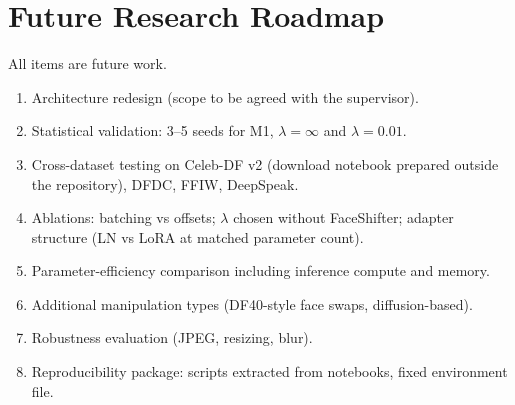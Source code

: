 \documentclass[10pt,a4paper]{article}
\begin{document}
\section{Future Research Roadmap}\label{sec:roadmap}
All items are future work.
\begin{enumerate}
\item Architecture redesign (scope to be agreed with the supervisor).
\item Statistical validation: 3--5 seeds for M1, \(\lambda=\infty\) and \(\lambda=0.01\).
\item Cross-dataset testing on Celeb-DF v2 (download notebook prepared outside the repository), DFDC,
FFIW, DeepSpeak.
\item Ablations: batching vs offsets; \(\lambda\) chosen without FaceShifter; adapter structure (LN vs
LoRA at matched parameter count).
\item Parameter-efficiency comparison including inference compute and memory.
\item Additional manipulation types (DF40-style face swaps, diffusion-based).
\item Robustness evaluation (JPEG, resizing, blur).
\item Reproducibility package: scripts extracted from notebooks, fixed environment file.
\end{enumerate}
\end{document}
